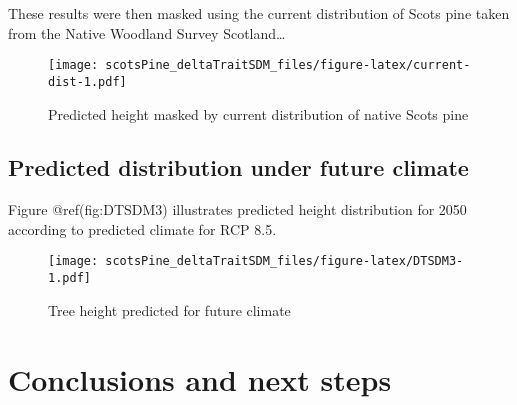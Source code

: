 \documentclass[]{article}
\begin{document}
These results were then masked using the current distribution of Scots
pine taken from the Native Woodland Survey Scotland\ldots{}

\begin{figure}
\centering
\texttt{[image: scotsPine\_deltaTraitSDM\_files/figure-latex/current-dist-1.pdf]}
\caption{Predicted height masked by current distribution of native Scots
pine}
\end{figure}

\subsection{Predicted distribution under future
climate}\label{predicted-distribution-under-future-climate}

Figure @ref(fig:DTSDM3) illustrates predicted height distribution for
2050 according to predicted climate for RCP 8.5.

\begin{figure}
\centering
\texttt{[image: scotsPine\_deltaTraitSDM\_files/figure-latex/DTSDM3-1.pdf]}
\caption{Tree height predicted for future climate}
\end{figure}

\section{Conclusions and next steps}\label{conclusions-and-next-steps}
\end{document}
